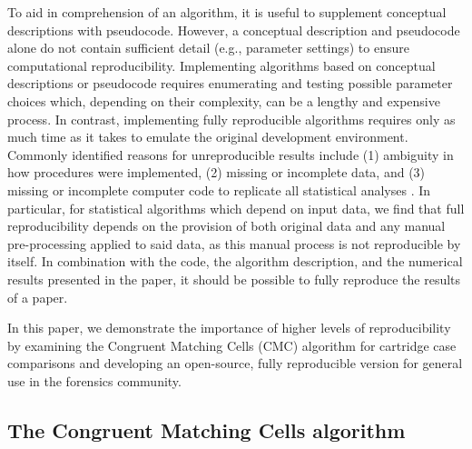 \documentclass[11pt,]{isuthesis}
\begin{document}
To aid in comprehension of an algorithm, it is useful to supplement conceptual descriptions with pseudocode.
However, a conceptual description and pseudocode alone do not contain sufficient detail (e.g., parameter settings) to ensure computational reproducibility.
Implementing algorithms based on conceptual descriptions or pseudocode requires enumerating and testing possible parameter choices which, depending on their complexity, can be a lengthy and expensive process.
In contrast, implementing fully reproducible algorithms requires only as much time as it takes to emulate the original development environment.
Commonly identified reasons for unreproducible results include (1) ambiguity in how procedures were implemented, (2) missing or incomplete data, and (3) missing or incomplete computer code to replicate all statistical analyses \citep{leek_is_2017}.
In particular, for statistical algorithms which depend on input data, we find that full reproducibility depends on the provision of both original data and any manual pre-processing applied to said data, as this manual process is not reproducible by itself.
In combination with the code, the algorithm description, and the numerical results presented in the paper, it should be possible to fully reproduce the results of a paper.

In this paper, we demonstrate the importance of higher levels of reproducibility by examining the Congruent Matching Cells (CMC) algorithm for cartridge case comparisons and developing an open-source, fully reproducible version for general use in the forensics community.

\hypertarget{the-congruent-matching-cells-algorithm}{%
\subsection{The Congruent Matching Cells algorithm}\label{the-congruent-matching-cells-algorithm}}
\end{document}
